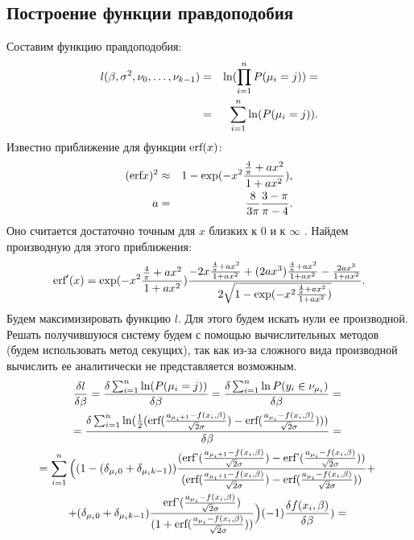 \documentclass[a4paper,14pt]{extarticle}
\begin{document}
\subsection{Построение функции правдоподобия}\label{sec4_1}
Составим функцию правдоподобия:
\begin{eqnarray}
    \label{eq22}l(\beta,\sigma^2, \nu_0,\dots, \nu_{k-1})&=&\textup{ln}(\prod_{i=1}^{n}P(\mu_i=j))=\\
    \label{eq23}&=&\sum_{i=1}^{n}\ln(P(\mu_i=j)).
\end{eqnarray}
Известно приближение для функции $\textup{erf}(x)$:
\begin{eqnarray}
    \label{eq24}(\textup{erf} x)^2&\approx& 1- \exp(-x^2 \frac{\frac{4}{\pi}+ax^2}{1+ax^2}),\\
    \nonumber a&=&\frac{8}{3\pi}\frac{3-\pi}{\pi -4}.
\end{eqnarray}
Оно считается достаточно точным для $x$ близких к $0$ и к $\infty$ \cite{Winitzki}. \hfill\break
Найдем производную для этого приближения:
\begin{eqnarray}
    \label{eq26}\textup{erf}'(x) = \exp(-x^2 \frac{\frac{4}{\pi}+ax^2}{1+ax^2}) \frac{-2x\frac{\frac{4}{\pi}+ax^2}{1+ax^2}+(2ax^3)\frac{\frac{4}{\pi}+ax^2}{1+ax^2}-\frac{2ax^3}{1+ax^2}}{2\sqrt{1- \exp(-x^2 \frac{\frac{4}{\pi}+ax^2}{1+ax^2})}}.
\end{eqnarray}
Будем максимизировать функцию $l$.
Для этого будем искать нули ее производной. Решать получившуюся систему будем с помощью вычислительных методов (будем использовать метод секущих), так как из-за сложного
вида производной вычислить ее аналитически не представляется возможным.
\begin{multline}
    \label{eq27}\frac{\delta l}{\delta \beta}=\frac{\delta \sum_{i=1}^{n}\ln(P(\mu_i=j))}{\delta \beta}=\frac{\delta \sum_{i=1}^{n}\ln P(y_i\in \nu_{\mu_i})}{\delta \beta}=~\\
    =\frac{\delta \sum_{i=1}^{n} \ln(\frac{1}{2}(\textup{erf}(\frac{a_{\mu_i+1}-f(x_i,\beta)}{\sqrt{2}\sigma})-\textup{erf}(\frac{a_{\mu_i}-f(x_i,\beta)}{\sqrt{2}\sigma})) )         }{\delta \beta}=~\\
    =  \sum_{i=1}^{n}\Big((1-(\delta_{\mu_i 0}+\delta_{\mu_i k-1}))\frac{(\textup{erf'}(\frac{a_{\mu_i+1}-f(x_i,\beta)}{\sqrt{2}\sigma})-\textup{erf'}(\frac{a_{\mu_i}-f(x_i,\beta)}{\sqrt{2}\sigma}))}{ (\textup{erf}(\frac{a_{\mu_i+1}-f(x_i,\beta)}{\sqrt{2}\sigma})-\textup{erf}(\frac{a_{\mu_i}-f(x_i,\beta)}{\sqrt{2}\sigma}))}+~\\
    +(\delta_{\mu_i 0}+\delta_{\mu_i k-1})\frac{\textup{erf'}(\frac{a_{\mu_i}-f(x_i,\beta)}{\sqrt{2}\sigma})}{(1+\textup{erf}(\frac{a_{\mu_i}-f(x_i,\beta)}{\sqrt{2}\sigma}))}\Big)  (-1) \frac{\delta f(x_i,\beta)}{\delta \beta} )=~
\end{multline}
\end{document}
